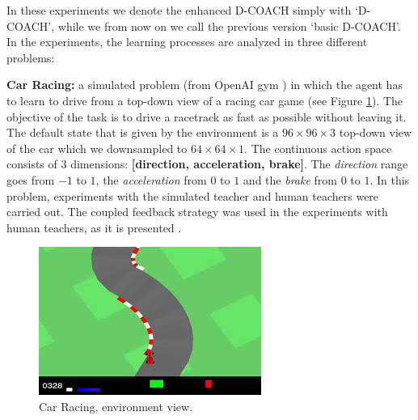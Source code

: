 In these experiments we denote the enhanced D-COACH simply with `D-COACH', while we from now on we call the previous version `basic D-COACH'. In the experiments, the learning processes are analyzed in three different problems:

\textbf{Car Racing:} a simulated problem (from OpenAI gym \cite{brockman2016openai}) in which the agent has to learn to drive from a top-down view of a racing car game (see Figure \ref{fig:Car_Racing}). The objective of the task is to drive a racetrack as fast as possible without leaving it. The default state that is given by the environment is a $96\times96\times3$ top-down view of the car which we downsampled to $64\times64\times1$. The continuous action space consists of 3 dimensions: \textbf{[direction, acceleration, brake]}. The \emph{direction} range goes from $-1$ to $1$, the \emph{acceleration} from $0$ to $1$ and the \emph{brake} from $0$ to $1$. In this problem, experiments with the simulated teacher and human teachers were carried out. The coupled feedback strategy was used in the experiments with human teachers, as it is presented \cite{perez2018interactive}.

\begin{figure}[h]
    \centering
    \includegraphics[scale=0.8]{imagenes/cap3/car_racing_env.jpg}
    \caption{Car Racing, environment view.}
    \label{fig:Car_Racing}
\end{figure}
    
